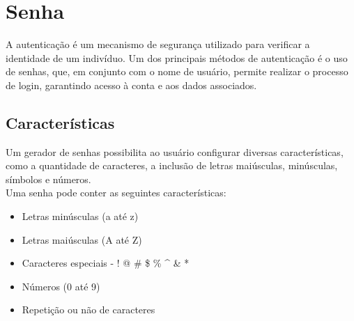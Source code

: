 \section{Senha}

A autenticação é um mecanismo de segurança utilizado para verificar a identidade de um indivíduo. Um dos principais métodos de autenticação é o uso de senhas, que, em conjunto com o nome de usuário, permite realizar o processo de login, garantindo acesso à conta e aos dados associados.

\subsection{Características}

Um gerador de senhas possibilita ao usuário configurar diversas características, como a quantidade de caracteres, a inclusão de letras maiúsculas, minúsculas, símbolos e números.\\

Uma senha pode conter as seguintes características:

\begin{itemize}
	\item Letras minúsculas (a até z)
	\item Letras maiúsculas (A até Z)
	\item Caracteres especiais - ! @ \# \$ \% \^{} \& *
	\item Números (0 até 9)
	\item Repetição ou não de caracteres
\end{itemize}

\pagebreak
